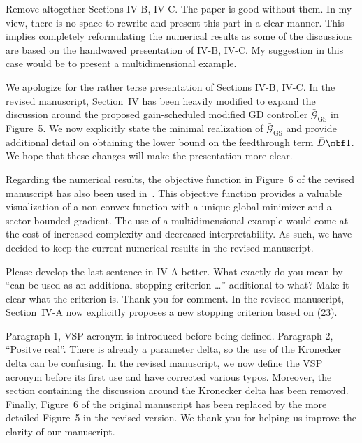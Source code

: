 \begin{rebuttal}
    {%
        Remove altogether Sections IV-B, IV-C. The paper is good without them. In my view, there is no space to rewrite and present this part in a clear manner. This implies completely reformulating the numerical results as some of the discussions are based on the handwaved presentation of IV-B, IV-C. My suggestion in this case would be to present a multidimensional example. 
    }%
    {%
        We apologize for the rather terse presentation of Sections IV-B, IV-C. In the revised manuscript, Section~IV has been heavily modified to expand the discussion around the proposed gain-scheduled modified GD controller \(\bar{\bm{\mathcal{G}}}_{\textrm{GS}}\) in Figure~5. We now explicitly state the minimal realization of \(\bar{\bm{\mathcal{G}}}_{\textrm{GS}}\) and provide additional detail on obtaining the lower bound on the feedthrough term \(\bar{D}\eye\). We hope that these changes will make the presentation more clear.

        Regarding the numerical results, the objective function in Figure~6 of the revised manuscript has also been used in~\cite{ugrinovskii,alex_petersen}. This objective function provides a valuable visualization of a non-convex function with a unique global minimizer and a sector-bounded gradient. The use of a multidimensional example would come at the cost of increased complexity and decreased interpretability. As such, we have decided to keep the current numerical results in the revised manuscript.
    }%
\end{rebuttal}
\begin{rebuttal}
    {%
        Please develop the last sentence in IV-A better. What exactly do you mean by ``can be used as an additional stopping criterion \dots'' additional to what? Make it clear what the criterion is. 
    }%
    {%
        Thank you for comment. In the revised manuscript, Section~IV-A now explicitly proposes a new stopping criterion based on (23).
    }%
\end{rebuttal}
\begin{rebuttal}
    {%
        Paragraph 1, VSP acronym is introduced before being defined. Paragraph 2, ``Positve real''. There is already a parameter delta, so the use of the Kronecker delta can be confusing.
    }%
    {%
        In the revised manuscript, we now define the VSP acronym before its first use and have corrected various typos. Moreover, the section containing the discussion around the Kronecker delta has been removed. Finally, Figure~6 of the original manuscript has been replaced by the more detailed Figure~5 in the revised version. We thank you for helping us improve the clarity of our manuscript.
    }%
\end{rebuttal}
